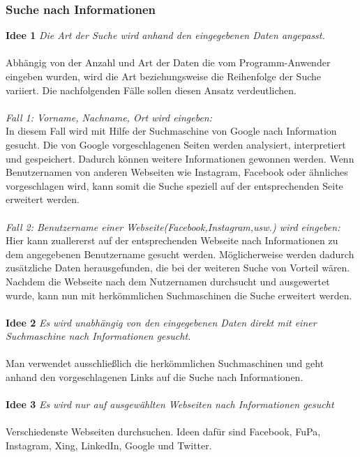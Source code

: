 		\subsubsection{Suche nach Informationen}
		\label{sec:Suche nach Information}
		{\bf Idee 1} \textit{Die Art der Suche wird anhand den eingegebenen Daten angepasst.}\\\\
		Abhängig von der Anzahl und Art der Daten die vom Programm-Anwender eingeben wurden, wird die Art beziehungsweise die Reihenfolge der Suche variiert. Die nachfolgenden Fälle sollen diesen Ansatz verdeutlichen.\\\\
		\textit{Fall 1: Vorname, Nachname, Ort wird eingeben:}\\
		In diesem Fall wird mit Hilfe der Suchmaschine von Google nach Information gesucht. Die von Google vorgeschlagenen Seiten werden analysiert, interpretiert und gespeichert. Dadurch können weitere Informationen gewonnen werden. Wenn Benutzernamen von anderen Webseiten wie Instagram, Facebook oder ähnliches vorgeschlagen wird, kann somit die Suche speziell auf der entsprechenden Seite erweitert werden.\\\\
		\textit{Fall 2: Benutzername einer Webseite(Facebook,Instagram,usw.) wird eingeben:}\\
		Hier kann zuallererst auf der entsprechenden Webseite nach Informationen zu dem angegebenen Benutzername gesucht werden. Möglicherweise werden dadurch zusätzliche Daten herausgefunden, die bei der weiteren Suche von Vorteil wären.\\
		Nachdem die Webseite nach dem Nutzernamen durchsucht und ausgewertet wurde, kann nun mit herkömmlichen Suchmaschinen die Suche erweitert werden.\\\\
		{\bf Idee 2} \textit{Es wird unabhängig von den eingegebenen Daten direkt mit einer Suchmaschine nach Informationen gesucht.}\\\\
		Man verwendet ausschließlich die herkömmlichen Suchmaschinen und geht anhand den vorgeschlagenen Links auf die Suche nach Informationen.\\\\
		{\bf Idee 3} \textit{Es wird nur auf ausgewählten Webseiten nach Informationen gesucht}\\\\
		Verschiedenste Webseiten durchsuchen. Ideen dafür sind Facebook, FuPa, Instagram, Xing, LinkedIn, Google und Twitter.\\
		
